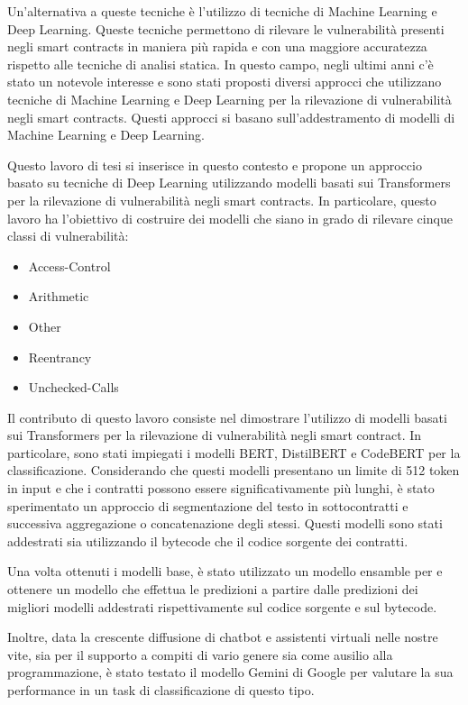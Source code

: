 \documentclass[../../Thesis.tex]{subfiles}
\begin{document}
Un'alternativa a queste tecniche è l'utilizzo di tecniche di Machine Learning e Deep Learning. Queste tecniche permettono di rilevare le vulnerabilità presenti negli smart contracts in maniera più rapida e con una maggiore accuratezza rispetto alle tecniche di analisi statica. In questo campo, negli ultimi anni c'è stato un notevole interesse e sono stati proposti diversi approcci che utilizzano tecniche di Machine Learning e Deep Learning per la rilevazione di vulnerabilità negli smart contracts. Questi approcci si basano sull'addestramento di modelli di Machine Learning e Deep Learning. 

Questo lavoro di tesi si inserisce in questo contesto e propone un approccio basato su tecniche di Deep Learning utilizzando modelli basati sui Transformers per la rilevazione di vulnerabilità negli smart contracts. In particolare, questo lavoro ha l'obiettivo di costruire dei modelli che siano in grado di rilevare cinque classi di vulnerabilità:
\begin{itemize}
    \item Access-Control
    \item Arithmetic
    \item Other
    \item Reentrancy
    \item Unchecked-Calls
\end{itemize}
 
Il contributo di questo lavoro consiste nel dimostrare l'utilizzo di modelli basati sui Transformers per la rilevazione di vulnerabilità negli smart contract. In particolare, sono stati impiegati i modelli BERT, DistilBERT e CodeBERT per la classificazione. Considerando che questi modelli presentano un limite di 512 token in input e che i contratti possono essere significativamente più lunghi, è stato sperimentato un approccio di segmentazione del testo in sottocontratti e successiva aggregazione o concatenazione degli stessi. Questi modelli sono stati addestrati sia utilizzando il bytecode che il codice sorgente dei contratti. 

Una volta ottenuti i modelli base, è stato utilizzato un modello ensamble per e ottenere un modello che effettua le predizioni a partire dalle predizioni dei migliori modelli addestrati rispettivamente sul codice sorgente e sul bytecode. 

Inoltre, data la crescente diffusione di chatbot e assistenti virtuali nelle nostre vite, sia per il supporto a compiti di vario genere sia come ausilio alla programmazione, è stato testato il modello Gemini di Google per valutare la sua performance in un task di classificazione di questo tipo. 
\end{document}
